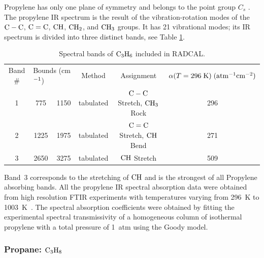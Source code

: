 Propylene has only one plane of symmetry and belongs to the point group $C_s$ \cite{Herzberg:1949}. The propylene IR spectrum is the result of the vibration-rotation modes of the $\rm C-C$, $\rm C=C$, $\rm CH$, $\rm CH_2$, and $\rm CH_3$ groups. It has 21 vibrational modes; its IR spectrum is divided into three distinct bands, see Table \ref{Table::C3H6}.
\begin{table}[ht]
   \centering
   \caption{Spectral bands of $\rm C_3H_6$ included in RADCAL.}
   \vspace{0.1in}
   \label{Table::C3H6}
   \begin{tabular}{|c|c|c|c|c|c|}
    \hline
    Band \# & \multicolumn{2}{|l|}{Bounds (cm$\rm ^{-1}$) } & Method & Assignment & $\alpha(T=296 \; {\rm K}) \; (\rm {atm^{-1} cm^{-2}})$\\
    \cline{1-6}
    1 & 775  & 1150 & tabulated &  $\rm C-C$ Stretch, $\rm CH_3$ Rock & 296 \\
    2 & 1225 & 1975 & tabulated &  $\rm C=C$ Stretch, $\rm CH$ Bend   & 271 \\
    3 & 2650 & 3275 & tabulated &  $\rm CH$ Stretch                   & 509 \\
    \hline
   \end{tabular}
\end{table}
Band~3 corresponds to the stretching of $\rm CH$ and is the strongest of all Propylene absorbing bands. All the propylene IR spectral absorption data were obtained from high resolution FTIR experiments with temperatures varying from 296~K to 1003~K~\cite{Wakatsuki:2005}. The spectral absorption coefficients were obtained by fitting the experimental spectral transmissivity of a homogeneous column of isothermal propylene with a total pressure of 1~atm using the Goody model.

\subsubsection{Propane: $\rm C_3H_8$}

